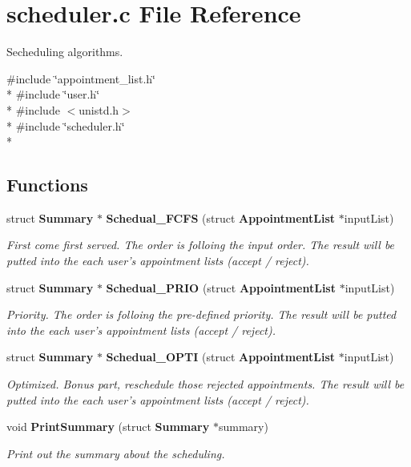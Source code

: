 \section{scheduler.\+c File Reference}
\label{scheduler_8c}


Secheduling algorithms.  


{\ttfamily \#include \char`\"{}appointment\+\_\+list.\+h\char`\"{}}\\*
{\ttfamily \#include \char`\"{}user.\+h\char`\"{}}\\*
{\ttfamily \#include $<$unistd.\+h$>$}\\*
{\ttfamily \#include \char`\"{}scheduler.\+h\char`\"{}}\\*
\subsection*{Functions}
\begin{DoxyCompactItemize}
\item 
struct {\bf Summary} $\ast$ {\bf Schedual\+\_\+\+F\+C\+F\+S} (struct {\bf Appointment\+List} $\ast$input\+List)\label{scheduler_8c_ab1a6239f9cfb939239ea5a6327fc5396}

\begin{DoxyCompactList}\small\item\em First come first served. The order is folloing the input order. The result will be putted into the each user's appointment lists (accept / reject). \end{DoxyCompactList}\item 
struct {\bf Summary} $\ast$ {\bf Schedual\+\_\+\+P\+R\+I\+O} (struct {\bf Appointment\+List} $\ast$input\+List)\label{scheduler_8c_ace53e33f078566371bac6500f263b9e4}

\begin{DoxyCompactList}\small\item\em Priority. The order is folloing the pre-\/defined priority. The result will be putted into the each user's appointment lists (accept / reject). \end{DoxyCompactList}\item 
struct {\bf Summary} $\ast$ {\bf Schedual\+\_\+\+O\+P\+T\+I} (struct {\bf Appointment\+List} $\ast$input\+List)\label{scheduler_8c_a00e50377d32b3bee0e5d5982da684eb2}

\begin{DoxyCompactList}\small\item\em Optimized. Bonus part, reschedule those rejected appointments. The result will be putted into the each user's appointment lists (accept / reject). \end{DoxyCompactList}\item 
void {\bf Print\+Summary} (struct {\bf Summary} $\ast$summary)\label{scheduler_8c_aff1618f427d441142f2d7706441e8113}

\begin{DoxyCompactList}\small\item\em Print out the summary about the scheduling. \end{DoxyCompactList}\end{DoxyCompactItemize}


